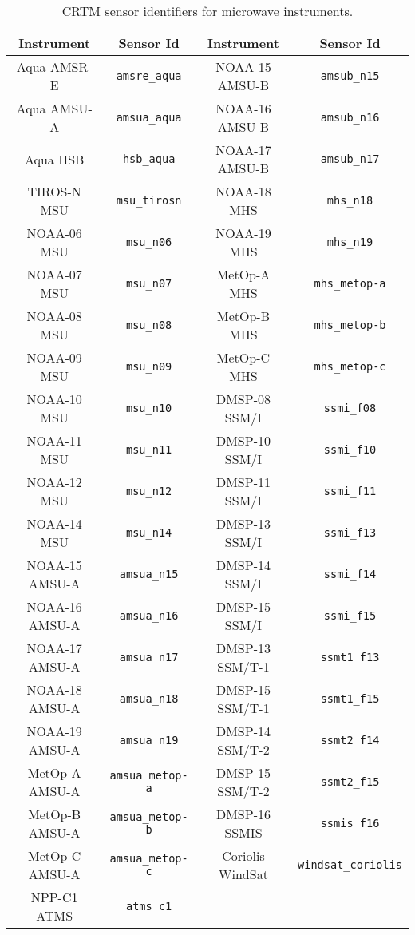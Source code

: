 \begin{table}[htp]
  \centering
  \begin{tabular}{|c|c||c|c|}
    \hline
    \sffamily\textbf{Instrument} & \sffamily\textbf{Sensor Id} & \sffamily\textbf{Instrument} & \sffamily\textbf{Sensor Id} \\
    \hline\hline
Aqua AMSR-E & \texttt{amsre\_aqua}       & NOAA-15 AMSU-B & \texttt{amsub\_n15}           \\
Aqua AMSU-A & \texttt{amsua\_aqua}       & NOAA-16 AMSU-B & \texttt{amsub\_n16}           \\
Aqua HSB & \texttt{hsb\_aqua}            & NOAA-17 AMSU-B & \texttt{amsub\_n17}           \\
TIROS-N MSU & \texttt{msu\_tirosn}       & NOAA-18 MHS & \texttt{mhs\_n18}                \\
NOAA-06 MSU & \texttt{msu\_n06}          & NOAA-19 MHS & \texttt{mhs\_n19}                \\
NOAA-07 MSU & \texttt{msu\_n07}          & MetOp-A MHS & \texttt{mhs\_metop-a}            \\
NOAA-08 MSU & \texttt{msu\_n08}          & MetOp-B MHS & \texttt{mhs\_metop-b}            \\
NOAA-09 MSU & \texttt{msu\_n09}          & MetOp-C MHS & \texttt{mhs\_metop-c}            \\
NOAA-10 MSU & \texttt{msu\_n10}          & DMSP-08 SSM/I & \texttt{ssmi\_f08}             \\
NOAA-11 MSU & \texttt{msu\_n11}          & DMSP-10 SSM/I & \texttt{ssmi\_f10}             \\
NOAA-12 MSU & \texttt{msu\_n12}          & DMSP-11 SSM/I & \texttt{ssmi\_f11}             \\
NOAA-14 MSU & \texttt{msu\_n14}          & DMSP-13 SSM/I & \texttt{ssmi\_f13}             \\
NOAA-15 AMSU-A & \texttt{amsua\_n15}     & DMSP-14 SSM/I & \texttt{ssmi\_f14}             \\
NOAA-16 AMSU-A & \texttt{amsua\_n16}     & DMSP-15 SSM/I & \texttt{ssmi\_f15}             \\
NOAA-17 AMSU-A & \texttt{amsua\_n17}     & DMSP-13 SSM/T-1 & \texttt{ssmt1\_f13}          \\
NOAA-18 AMSU-A & \texttt{amsua\_n18}     & DMSP-15 SSM/T-1 & \texttt{ssmt1\_f15}          \\
NOAA-19 AMSU-A & \texttt{amsua\_n19}     & DMSP-14 SSM/T-2 & \texttt{ssmt2\_f14}          \\
MetOp-A AMSU-A & \texttt{amsua\_metop-a} & DMSP-15 SSM/T-2 & \texttt{ssmt2\_f15}          \\
MetOp-B AMSU-A & \texttt{amsua\_metop-b} & DMSP-16 SSMIS & \texttt{ssmis\_f16}            \\
MetOp-C AMSU-A & \texttt{amsua\_metop-c} & Coriolis WindSat & \texttt{windsat\_coriolis}  \\
NPP-C1 ATMS & \texttt{atms\_c1}          &                  &                             \\
    \hline
  \end{tabular}
  \caption{CRTM sensor identifiers for microwave instruments.}
  \label{tab:mw_sensor_id}
\end{table}


